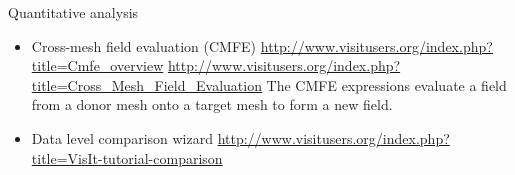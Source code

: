 \begin{frame}{Quantitative analysis}{}
  \begin{itemize}\setlength{\itemsep}{3mm}
  \item Cross-mesh field evaluation (CMFE)
    \url{http://www.visitusers.org/index.php?title=Cmfe_overview}
    \url{http://www.visitusers.org/index.php?title=Cross_Mesh_Field_Evaluation}
    The CMFE expressions evaluate a field from a donor mesh onto a target mesh to form a new field.
  \item Data level comparison wizard
    \url{http://www.visitusers.org/index.php?title=VisIt-tutorial-comparison}
  \end{itemize}
\end{frame}
